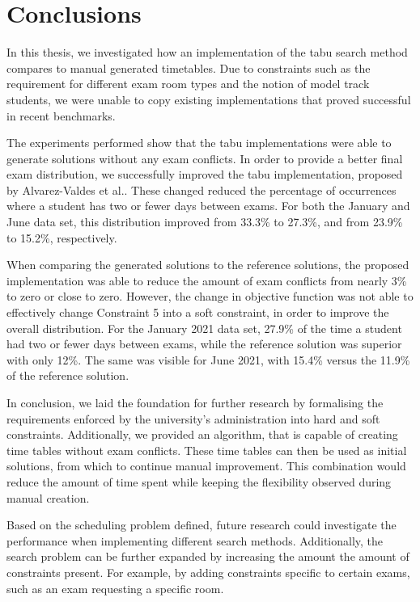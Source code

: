 
\section{Conclusions}\label{sec:conclusion}

 In this thesis, we investigated how an implementation of the \acrlong{tabu} search method compares to manual generated timetables. Due to constraints such as the requirement for different exam room types and the notion of model track students, we were unable to copy existing implementations that proved successful in recent benchmarks. 

 The experiments performed show that the \acrshort{tabu} implementations were able to generate solutions without any exam conflicts. In order to provide a better final exam distribution, we successfully improved the \acrshort{tabu} implementation, proposed by Alvarez-Valdes et al.\cite{alvarez1997}. These changed reduced the percentage of occurrences where a student has two or fewer days between exams. For both the January and June data set, this distribution improved from 33.3\% to 27.3\%, and from 23.9\% to 15.2\%, respectively.
 
When comparing the generated solutions to the reference solutions, the proposed implementation was able to reduce the amount of exam conflicts from nearly 3\% to zero or close to zero. However, the change in objective function was not able to effectively change Constraint 5 into a soft constraint, in order to improve the overall distribution. For the January 2021 data set, 27.9\% of the time a student had two or fewer days between exams, while the reference solution was superior with only 12\%. The same was visible for June 2021, with 15.4\% versus the 11.9\% of the reference solution.

In conclusion, we laid the foundation for further research by formalising the requirements enforced by the university's administration into hard and soft constraints. Additionally, we provided an algorithm, that is capable of creating time tables without exam conflicts. These time tables can then be used as initial solutions, from which to continue manual improvement. This combination would reduce the amount of time spent while keeping the flexibility observed during manual creation.

Based on the scheduling problem defined, future research could investigate the performance when implementing different search methods. Additionally, the search problem can be further expanded by increasing the amount the amount of constraints present. For example, by adding constraints specific to certain exams, such as an exam requesting a specific room.



